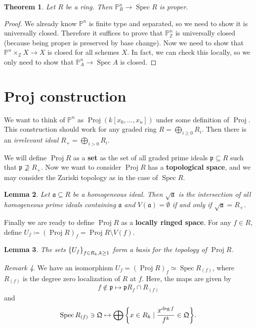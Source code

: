 \documentclass[leqno, openany]{memoir}
\newtheorem{thm}{Theorem}[section]
\newtheorem{lem}[thm]{Lemma}
\theoremstyle{definition}
\theoremstyle{remark}
\newtheorem{rmk}[thm]{Remark}
\theoremstyle{plain}
\theoremstyle{definition}
\theoremstyle{remark}
\newcommand{\Z}{\mathbb{Z}}
\renewcommand{\P}{\mathbb{P}}
\newcommand{\mf}[1]{\mathfrak{#1}}
\DeclareMathOperator{\Spec}{Spec}
\DeclareMathOperator{\Proj}{Proj}
\begin{document}
\begin{thm}
    Let $R$ be a ring. Then $\P^n_R \to \Spec R$ is proper.
\end{thm}

\begin{proof}
    We already know $\P^n$ is finite type and separated, so we need to show it is universally closed. Therefore it suffices to prove that $\P^n_{\Z}$ is universally closed (because being proper is preserved by base change). Now we need to show that $\P^n \times_{\Z} X \to X$ is closed for all schemes $X$. In fact, we can check this locally, so we only need to show that $\P^n_{A} \to \Spec A$ is closed.
\end{proof}

\section{Proj construction}%
\label{sec:proj_construction}

We want to think of $\P^n$ as $\Proj(k[x_0, \ldots, x_n])$ under some definition of $\Proj$. This construction should work for any graded ring $R = \bigoplus_{i \geq 0} R_i$. Then there is an \textit{irrelevant ideal} $R_+ = \bigoplus_{i > 0} R_i$. 

We will define $\Proj R$ as a \textbf{set} as the set of all graded prime ideals $\mf{p} \subseteq R$ such that $\mf{p} \not\supseteq R_+$. Now we want to consider $\Proj R$ has a \textbf{topological space}, and we may consider the Zariski topology as in the case of $\Spec R$. 

\begin{lem}
    Let $\mf{a} \subseteq R$ be a homogeneous ideal. Then $\sqrt{\mf{a}}$ is the intersection of all homogeneous prime ideals containing $\mf{a}$ and $V(\mf{a}) = \emptyset$ if and only if $\sqrt{\mf{a}} = R_+$.
\end{lem}

Finally we are ready to define $\Proj R$ as a \textbf{locally ringed space}. For any $f \in R$, define $U_f \coloneqq {(\Proj R)}_f = \Proj R \setminus V(f)$. 

\begin{lem}
    The sets $\qty{U_f}_{f \in R_k, k \geq 1}$ form a basis for the topology of $\Proj R$.
\end{lem}

\begin{rmk}\leavevmode
    We have an isomorphism $U_f = { (\Proj R) }_f \simeq \Spec R_{(f)}$, where $R_{(f)}$ is the degree zero localization of $R$ at $f$. Here, the maps are given by 
    \[ f \notin \mf{p} \mapsto \mf{p} R_f \cap R_{(f)} \] and 
    \[ \Spec R_{(f)} \ni \mf{Q} \mapsto \bigoplus \qty{x \in R_k \mid \frac{x^{\deg f}}{f^k} \in \mf{Q}}. \]
\end{rmk}
\end{document}
